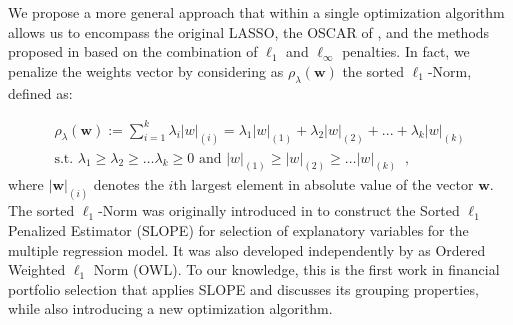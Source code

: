 \documentclass[12pt, a4paper]{article}
\newcommand{\bfw}{\boldsymbol{w} }
\begin{document}
We propose a more general approach that within a single optimization algorithm allows us to encompass the original LASSO, the OSCAR of \cite{Bondell2008}, and the methods proposed in \cite{Xing2014} based on the combination of $\ell_1$ and $\ell_\infty$ penalties. In fact, we penalize the weights vector by considering as $\rho_{\lambda}(\bfw)$ the sorted $\ell_{1}$-Norm, defined as:

\begin{gather}
\rho_\lambda(\bfw) := \sum_{i=1}^k \lambda_i |w|_{(i)} = \lambda_{1} |w|_{(1)} + \lambda_{2}|w|_{(2)} + ... + \lambda_{k}|w|_{(k)}\\ \text{s.t.  } \lambda_1 \ge \lambda_2 \ge \dots \lambda_k \ge 0 \text{ and }  |w|_{(1)} \ge |w|_{(2)} \ge \dots |w|_{(k)} \;\;, \label{penalty}
\end{gather}
where $|\bfw|_{(i)}$ denotes the $i$th largest element in absolute value of the vector $\bfw$.
The sorted $\ell_{1}$-Norm was originally introduced in \cite{Bogdan2013, Bogdan2015} to construct the Sorted $\ell_{1}$ Penalized Estimator (SLOPE) for selection of 
explanatory variables for the multiple regression model. It was also developed independently by \cite{Zeng2014} as Ordered Weighted $\ell_{1}$ Norm (OWL). To our knowledge, this is the first work in financial portfolio selection that applies SLOPE and discusses its grouping properties, while also introducing a new optimization algorithm.
\end{document}
